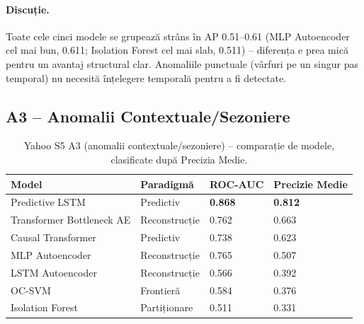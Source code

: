 \paragraph{Discuție.} Toate cele cinci modele se grupează strâns în AP 0.51--0.61 (MLP Autoencoder cel mai bun, 0.611; Isolation Forest cel mai slab, 0.511) -- diferența e prea mică pentru un avantaj structural clar. Anomaliile punctuale (vârfuri pe un singur pas temporal) nu necesită înțelegere temporală pentru a fi detectate.

\subsection{A3 -- Anomalii Contextuale/Sezoniere}

\begin{table}[h]
\centering
\footnotesize
\begin{tabular}{@{}llll@{}}
\toprule
Model & Paradigmă & ROC-AUC & Precizie Medie \\
\midrule
Predictive LSTM            & Predictiv     & \textbf{0.868} & \textbf{0.812} \\
Transformer Bottleneck AE  & Reconstrucție & 0.762          & 0.663 \\
Causal Transformer         & Predictiv     & 0.738          & 0.623 \\
MLP Autoencoder            & Reconstrucție & 0.765          & 0.507 \\
LSTM Autoencoder           & Reconstrucție & 0.566          & 0.392 \\
OC-SVM                     & Frontieră       & 0.584          & 0.376 \\
Isolation Forest           & Partiționare      & 0.511          & 0.331 \\
\bottomrule
\end{tabular}
\caption{Yahoo S5 A3 (anomalii contextuale/sezoniere) -- comparație de modele, clasificate după Precizia Medie.}
\label{tab:yahoo-a3}
\end{table}

